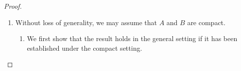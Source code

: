 \begin{proof}
\begin{enumerate}

        \item Without loss of generality, we may assume that \(A\) and \(B\) are compact.

        \begin{enumerate}
            \item We first show that the result holds in the general setting if it has been established under the compact setting. 


\end{enumerate}
\end{enumerate}
\end{proof}
